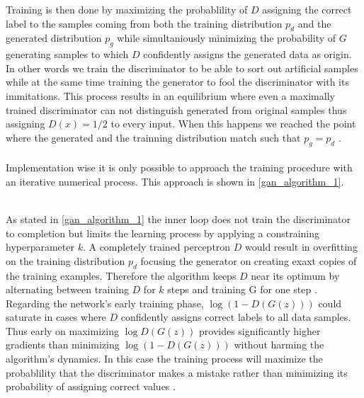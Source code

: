   Training is then done by maximizing the probablility of \( D \) assigning the correct label to the samples coming from both the training distribution \( p_d \) and the generated distribution \( p_g \) while simultaniously minimizing the probability of \( G \) generating samples to which \( D \) confidently assigns the generated data as origin.
  In other words we train the discriminator to be able to sort out artificial samples while at the same time training the generator to fool the discriminator with its immitations.
  This process results in an equilibrium where even a maximally trained discriminator can not distinguish generated from original samples thus assigning \( D(x) = 1/2 \) to every input.
  When this happens we reached the point where the generated and the trainning distribution match such that \( p_g = p_d \) \cite{1}.
  \\
  \\
  Implementation wise it is only possible to approach the training procedure with an iterative numerical process.
  This approach is shown in \cref{gan_algorithm_1}.
  \\
  \\

    \begin{algorithm}[H]
      
      \cite[Algorithm (1)]{1}
    \end{algorithm}

  As stated in \cref{gan_algorithm_1} the inner loop does not train the discriminator to completion but limits the learning process by applying a constraining hyperparameter \( k \).
  A completely trained perceptron \( D \) would result in overfitting on the training distribution \( p_d \) focusing the generator on creating exaxt copies of the training examples.
  Therefore the algorithm keeps \( D \) near its optimum by alternating between training \( D \) for \( k \) steps and training G for one step \cite{1}.
  Regarding the network's early training phase, \( \log ( 1 - D(G(z)) ) \) could saturate in cases where \( D \) confidently assigns correct labels to all data samples.
  Thus early on maximizing \( \log D(G(z)) \) provides significantly higher gradients than minimizing \( \log( 1 - D(G(z)) ) \) without harming the algorithm's dynamics. In this case the training process will maximize the probablility that the discriminator makes a mistake rather than minimizing its probability of assigning correct values \cite{1}.

